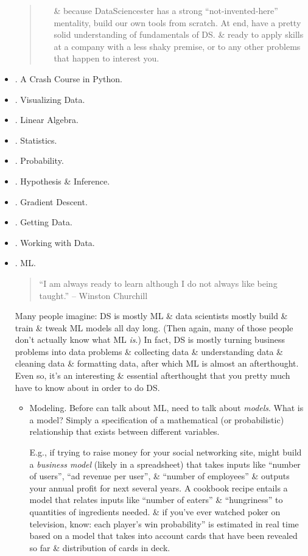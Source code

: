 \documentclass{article}
\begin{document}
\begin{itemize}
\begin{quote}
\begin{itemize}
			\& because DataSciencester has a strong ``not-invented-here'' mentality, build our own tools from scratch. At end, have a pretty solid understanding of fundamentals of DS. \& ready to apply skills at a company with a less shaky premise, or to any other problems that happen to interest you.
		\end{itemize}
	\end{quote}
	\item {. A Crash Course in Python.}
	\item {. Visualizing Data.}
	\item {. Linear Algebra.}
	\item {. Statistics.}
	\item {. Probability.}
	\item {. Hypothesis \& Inference.}
	\item {. Gradient Descent.}
	\item {. Getting Data.}
	\item {. Working with Data.}
	\item {. ML.}
	\begin{quote}
		``I am always ready to learn although I do not always like being taught.'' -- {\sc Winston Churchill}
	\end{quote}
	Many people imagine: DS is mostly ML \& data scientists mostly build \& train \& tweak ML models all day long. (Then again, many of those people don't actually know what ML {\it is}.) In fact, DS is mostly turning business problems into data problems \& collecting data \& understanding data \& cleaning data \& formatting data, after which ML is almost an afterthought. Even so, it's an interesting \& essential afterthought that you pretty much have to know about in order to do DS.
	\begin{itemize}
		\item {\sf Modeling.} Before can talk about ML, need to talk about {\it models}. What is a model? Simply a specification of a mathematical (or probabilistic) relationship that exists between different variables.
		
		E.g., if trying to raise money for your social networking site, might build a {\it business model} (likely in a spreadsheet) that takes inputs like ``number of users'', ``ad revenue per user'', \& ``number of employees'' \& outputs your annual profit for next several years. A cookbook recipe entails a model that relates inputs like ``number of eaters'' \& ``hungriness'' to quantities of ingredients needed. \& if you've ever watched poker on television, know: each player's win probability'' is estimated in real time based on a model that takes into account cards that have been revealed so far \& distribution of cards in deck.
		

\end{itemize}
\end{itemize}
\end{document}
